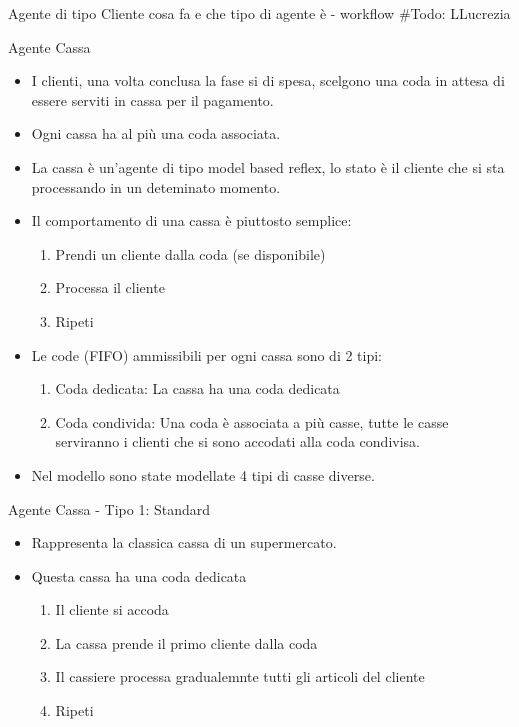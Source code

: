 \begin{frame}{Agente di tipo Cliente}
	\centering
	cosa fa e che tipo di agente è - workflow
	\#Todo: LLucrezia
\end{frame}




\begin{frame}{Agente Cassa}
	\begin{itemize}
		\item I clienti, una volta conclusa la fase si di spesa, scelgono una coda in attesa di essere serviti in cassa per il pagamento.
		\item Ogni cassa ha al più una coda associata.
		\item La cassa è un'agente di tipo model based reflex, lo stato è il cliente che si sta processando in un deteminato momento.
		\item Il comportamento di una cassa è piuttosto semplice:
		\begin{enumerate}
			\item Prendi un cliente dalla coda (se disponibile)
			\item Processa il cliente
			\item Ripeti
		\end{enumerate}
		\item Le code (FIFO) ammissibili per ogni cassa sono di 2 tipi:
		\begin{enumerate}
			\item Coda dedicata: La cassa ha una coda dedicata
			\item Coda condivida: Una coda è associata a più casse, tutte le casse serviranno i clienti che si sono accodati alla coda condivisa.
		\end{enumerate}
		\item Nel modello sono state modellate 4 tipi di casse diverse.
	
	\end{itemize}
\end{frame}

\begin{frame}{Agente Cassa - Tipo 1: Standard}
	\begin{itemize}
		\item Rappresenta la classica cassa di un supermercato.
		\item Questa cassa ha una coda dedicata
		\begin{enumerate}
			\item Il cliente si accoda
			\item La cassa prende il primo cliente dalla coda
			\item Il cassiere processa gradualemnte tutti gli articoli del cliente
			\item Ripeti
		\end{enumerate}		
	\end{itemize}
\end{frame}

